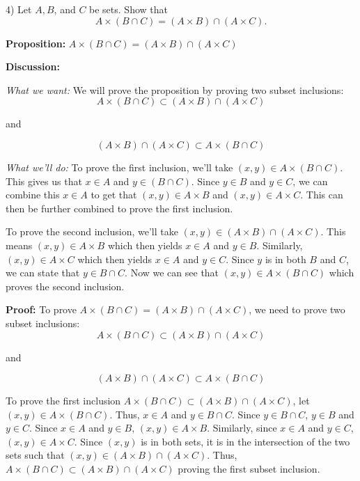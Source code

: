     \bigskip

    \begin{paragraph}{4)}
        Let $A, B$, and $C$ be sets.  Show that $$A \times (B \cap C) = (A \times B) \cap (A \times C).$$

        \separate\spacing

        \textbf{Proposition:} $A \times (B \cap C) = (A \times B) \cap (A \times C)$
        \spacing

        \textbf{Discussion:} 
        \spacing

        \textit{What we want:} We will prove the proposition by proving two subset inclusions:
        $$A \times (B \cap C) \subset (A \times B) \cap (A \times C)$$ 
        \begin{center}
            and
        \end{center}  
        $$(A \times B) \cap (A \times C) \subset A \times (B \cap C)$$

        \textit{What we'll do:} To prove the first inclusion, we'll take 
        $(x, y) \in A \times (B \cap C)$. This gives us that $x \in A$
        and $y \in (B \cap C)$. Since $y \in B$ and $y \in C$, we can combine this 
        $x \in A$ to get that $(x, y) \in A \times B$ and $(x, y) \in A \times C$.
        This can then be further combined to prove the first inclusion.
        \spacing

        To prove the second inclusion, we'll take $(x, y) \in (A \times B) \cap (A \times C).$
        This means $(x, y) \in A \times B$ which then yields $x \in A$ and $y \in B$.
        Similarly, $(x, y) \in A \times C$ which then yields $x \in A$ and $y \in C$.
        Since $y$ is in both $B$ and $C$, we can state that $y \in B \cap C$.
        Now we can see that $(x, y) \in A \times (B \cap C)$ which proves the 
        second inclusion.
        \spacing

        \textbf{Proof:} To prove $A \times (B \cap C) = (A \times B) \cap (A \times C)$,
        we need to prove two subset inclusions:
        $$A \times (B \cap C) \subset (A \times B) \cap (A \times C)$$
        \begin{center}and\end{center}
        $$(A \times B) \cap (A \times C) \subset A \times (B \cap C)$$

        To prove the first inclusion $A \times (B \cap C) \subset (A \times B) \cap (A \times C)$,
        let $(x, y) \in A \times (B \cap C)$. Thus, $x \in A$ and $y \in B \cap C$.
        Since $y \in B \cap C$, $y \in B$ and $y \in C$. Since $x \in A$ and $y \in B$,
        $(x, y) \in A \times B$. Similarly, since $x \in A$ and $y \in C$, 
        $(x, y) \in A \times C$. Since $(x, y)$ is in both sets, it is in the 
        intersection of the two sets such that $(x, y) \in (A \times B) \cap (A \times C)$.
        Thus, $A \times (B \cap C) \subset (A \times B) \cap (A \times C)$ proving the first
        subset inclusion.
        \spacing


\end{paragraph}
